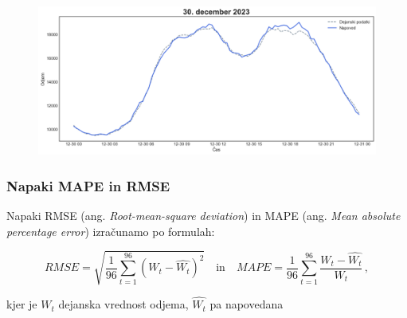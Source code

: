 \documentclass[14p, hyperref={unicode}]{beamer}
\begin{document}
\begin{frame}
\begin{figure}[!ht]
\begin{minipage}[c]{0.48\linewidth}
        \end{minipage}
        \hfill
        \begin{minipage}[c]{0.48\linewidth}
            \includegraphics[width=\linewidth]{napoved_4.png}
        \end{minipage}
    \end{figure}

\end{frame}




\begin{frame}
    
    \frametitle{Napaki MAPE in RMSE} 

    Napaki RMSE (ang. \emph{Root-mean-square deviation}) in 
    MAPE (ang. \emph{Mean absolute percentage error}) izračunamo po formulah:
    
    $$
    RMSE = \sqrt{\frac{1}{96}\sum_{t=1}^{96}{(W_t-\hat{W_t})^2}} \quad \textrm{in} \quad
    MAPE = \frac{1}{96}\sum_{t=1}^{96}{\frac{W_t-\hat{W_t}}{W_t}} \,,
    $$
    
    \noindent kjer je $W_t$ dejanska vrednost odjema, $\hat{W_t}$ pa napovedana

\end{frame}


\end{document}
